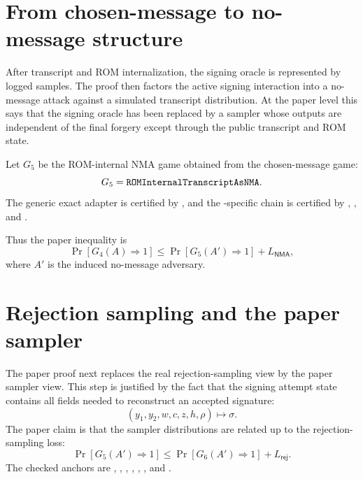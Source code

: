 \section{From chosen-message to no-message structure}
\label{sec:paper-proof-nma}

After transcript and ROM internalization, the signing oracle is represented by
logged samples.  The proof then factors the active signing interaction into a
no-message attack against a simulated transcript distribution.  At the paper
level this says that the signing oracle has been replaced by a sampler whose
outputs are independent of the final forgery except through the public
transcript and ROM state.

Let \(G_5\) be the ROM-internal NMA game obtained from the chosen-message game:
\[
  G_5 = \texttt{ROMInternalTranscriptAsNMA}.
\]
The generic exact adapter is certified by , and the
\haetae{}-specific chain is certified by
,
, and
.

Thus the paper inequality is
\[
  \Pr[G_4(A)\Rightarrow 1]
  \le
  \Pr[G_5(A')\Rightarrow 1] + L_{\mathsf{NMA}},
\]
where \(A'\) is the induced no-message adversary.

\section{Rejection sampling and the paper sampler}
\label{sec:paper-proof-rejection-sampling}

The paper proof next replaces the real rejection-sampling view by the paper
sampler view.  This step is justified by the fact that the signing attempt state
contains all fields needed to reconstruct an accepted signature:
\[
  (y_1,y_2,w,c,z,h,\rho)
  \longmapsto
  \sigma.
\]
The paper claim is that the sampler distributions are related up to the
rejection-sampling loss:
\[
  \Pr[G_5(A')\Rightarrow 1]
  \le
  \Pr[G_6(A')\Rightarrow 1] + L_{\mathsf{rej}}.
\]
The checked anchors are
,
,
,
,
,
, and
.

